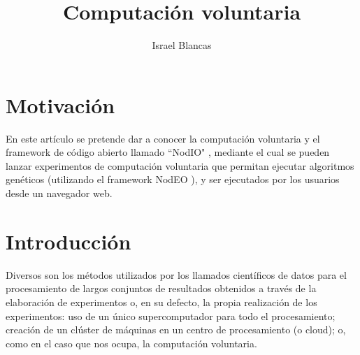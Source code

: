 \documentclass[runningheads,a4paper]{llncs}
\begin{document}
\mainmatter  %

\title{Computaci\'on voluntaria}


%
\author{Israel Blancas }
%


\maketitle


\begin{abstract}

\end{abstract}


\section{Motivaci\'on}
En este art\'iculo se pretende dar a conocer la computaci\'on voluntaria y
el framework de c\'odigo abierto llamado ``NodIO" \cite{nodio}, mediante el cual
se pueden lanzar experimentos de computaci\'on voluntaria
que permitan ejecutar algoritmos gen\'eticos (utilizando el framework NodEO \cite{nodeo}),
y ser ejecutados por los usuarios desde un navegador web.


\section{Introducci\'on}
%
Diversos son los m\'etodos utilizados por los llamados cient\'ificos
de datos para el procesamiento de largos conjuntos de resultados obtenidos
a trav\'es de la elaboraci\'on de experimentos o, en su defecto, la propia
realizaci\'on de los experimentos: uso de un \'unico supercomputador para
todo el procesamiento; creaci\'on de un cl\'uster de m\'aquinas en un centro
de procesamiento (o cloud); o, como en el caso que nos ocupa, la computaci\'on voluntaria.
\end{document}
